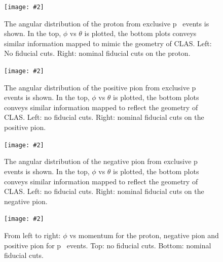 \newcommand{\onefig}[3]{
\begin{figure}
    \centering
    \texttt{[image: \#2]}
    \caption{#3}
    \label{#2}
    \end{figure}
}


\onefig{0.6}{figures/fiducial/fid2}{The angular distribution of the proton from exclusive \mbox{p \π[+] \π[-]} events is shown.  In the top, $\phi$ vs $\theta$ is plotted, the bottom plots conveys similar information mapped to mimic the geometry of CLAS. Left: No fiducial cuts. Right: nominal fiducial cuts on the proton.}
\onefig{0.6}{figures/fiducial/fid3}{The angular distribution of the positive pion from exclusive \mbox{p \π[+] \π[-]} events is shown.  In the top, $\phi$ vs $\theta$ is plotted, the bottom plots conveys similar information mapped to reflect the geometry of CLAS. Left: no fiducial cuts. Right: nominal fiducial cuts on the positive pion.}
\onefig{0.6}{figures/fiducial/fid4}{The angular distribution of the negative pion from exclusive \mbox{p \π[+] \π[-]} events is shown.  In the top, $\phi$ vs $\theta$ is plotted, the bottom plots conveys similar information mapped to reflect the geometry of CLAS. Left: no fiducial cuts. Right: nominal fiducial cuts on the negative pion.}
\onefig{0.7}{figures/fiducial/fid5}{From left to right: $\phi$ vs momentum for the proton, negative pion and positive pion for \mbox{p \π[+] \π[-]} events. Top: no fiducial cuts. Bottom: nominal fiducial cuts.}


